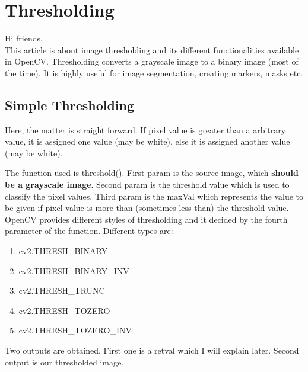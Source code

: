 \documentclass[a4paper,11pt]{book}
\begin{document}
\pagestyle{plain}

\chapter{Thresholding }

Hi friends,\\

This article is about \href{http://en.wikipedia.org/wiki/Thresholding_(image_processing)}{image thresholding} and its different functionalities available in OpenCV. Thresholding converts a grayscale image to a binary image (most of the time). It is highly useful for image segmentation, creating markers, masks etc.

\section{Simple Thresholding}

Here, the matter is straight forward. If pixel value is greater than a arbitrary value, it is assigned one value (may be white), else it is assigned another value (may be white).

The function used is \href{http://docs.opencv.org/modules/imgproc/doc/miscellaneous_transformations.html#cv2.threshold}{threshold()}. First param is the source image, which \textbf{should be a grayscale image}. Second param is the threshold value which is used to classify the pixel values. Third param is the maxVal which represents the value to be given if pixel value is more than (sometimes less than) the threshold value. OpenCV provides different styles of thresholding and it decided by the fourth parameter of the function. Different types are:

\begin{enumerate}
    \item cv2.THRESH\_BINARY
	\item cv2.THRESH\_BINARY\_INV
	\item cv2.THRESH\_TRUNC
	\item cv2.THRESH\_TOZERO
	\item cv2.THRESH\_TOZERO\_INV
\end{enumerate}

Two outputs are obtained. First one is a retval which I will explain later. Second output is our thresholded image.\\
 
\end{document}

